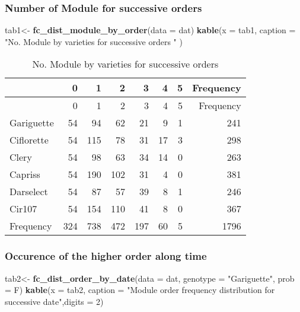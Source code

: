 \documentclass[]{article}
\newenvironment{Shaded}{\begin{snugshade}}{\end{snugshade}}
\newcommand{\KeywordTok}[1]{\textcolor[rgb]{0.13,0.29,0.53}{\textbf{#1}}}
\newcommand{\DataTypeTok}[1]{\textcolor[rgb]{0.13,0.29,0.53}{#1}}
\newcommand{\DecValTok}[1]{\textcolor[rgb]{0.00,0.00,0.81}{#1}}
\newcommand{\StringTok}[1]{\textcolor[rgb]{0.31,0.60,0.02}{#1}}
\newcommand{\NormalTok}[1]{#1}
\begin{document}
\subsubsection{Number of Module for successive
orders}\label{number-of-module-for-successive-orders}

\begin{Shaded}
\begin{Highlighting}[]
\NormalTok{tab1<-}\StringTok{ }\KeywordTok{fc_dist_module_by_order}\NormalTok{(}\DataTypeTok{data =}\NormalTok{ dat)}
\KeywordTok{kable}\NormalTok{(}\DataTypeTok{x =}\NormalTok{ tab1,}
      \DataTypeTok{caption =} \StringTok{"No. Module by varieties for successive orders "}
\NormalTok{      )}
\end{Highlighting}
\end{Shaded}

\begin{longtable}[]{@{}lrrrrrrr@{}}
\caption{No. Module by varieties for successive orders}\tabularnewline
\toprule
& 0 & 1 & 2 & 3 & 4 & 5 & Frequency\tabularnewline
\midrule
\endfirsthead
\toprule
& 0 & 1 & 2 & 3 & 4 & 5 & Frequency\tabularnewline
\midrule
\endhead
Gariguette & 54 & 94 & 62 & 21 & 9 & 1 & 241\tabularnewline
Ciflorette & 54 & 115 & 78 & 31 & 17 & 3 & 298\tabularnewline
Clery & 54 & 98 & 63 & 34 & 14 & 0 & 263\tabularnewline
Capriss & 54 & 190 & 102 & 31 & 4 & 0 & 381\tabularnewline
Darselect & 54 & 87 & 57 & 39 & 8 & 1 & 246\tabularnewline
Cir107 & 54 & 154 & 110 & 41 & 8 & 0 & 367\tabularnewline
Frequency & 324 & 738 & 472 & 197 & 60 & 5 & 1796\tabularnewline
\bottomrule
\end{longtable}

\subsubsection{Occurence of the higher order along
time}\label{occurence-of-the-higher-order-along-time}

\begin{Shaded}
\begin{Highlighting}[]
\NormalTok{tab2<-}\StringTok{ }\KeywordTok{fc_dist_order_by_date}\NormalTok{(}\DataTypeTok{data =}\NormalTok{ dat,}
                             \DataTypeTok{genotype =} \StringTok{"Gariguette"}\NormalTok{,}
                             \DataTypeTok{prob =}\NormalTok{ F)}
\KeywordTok{kable}\NormalTok{(}\DataTypeTok{x =}\NormalTok{ tab2, }
      \DataTypeTok{caption =} \StringTok{"Module order frequency distribution for successive date"}\NormalTok{,}\DataTypeTok{digits =} \DecValTok{2}\NormalTok{)}
\end{Highlighting}
\end{Shaded}
\end{document}
